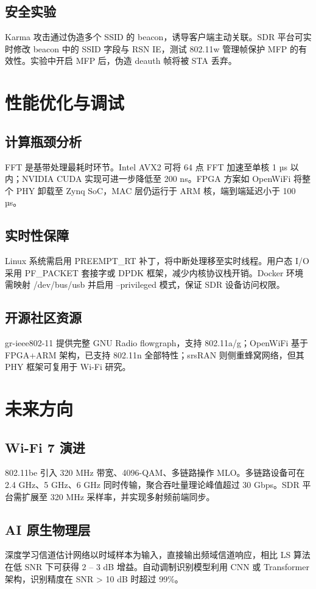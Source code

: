 \section{安全实验}
Karma 攻击通过伪造多个 SSID 的 beacon，诱导客户端主动关联。SDR 平台可实时修改 beacon 中的 SSID 字段与 RSN IE，测试 802.11w 管理帧保护 MFP 的有效性。实验中开启 MFP 后，伪造 deauth 帧将被 STA 丢弃。\par
\chapter{性能优化与调试}
\section{计算瓶颈分析}
FFT 是基带处理最耗时环节。Intel AVX2 可将 64 点 FFT 加速至单核 1 µs 以内；NVIDIA CUDA 实现可进一步降低至 200 ns。FPGA 方案如 OpenWiFi 将整个 PHY 卸载至 Zynq SoC，MAC 层仍运行于 ARM 核，端到端延迟小于 100 µs。\par
\section{实时性保障}
Linux 系统需启用 PREEMPT\_{}RT 补丁，将中断处理移至实时线程。用户态 I/O 采用 PF\_{}PACKET 套接字或 DPDK 框架，减少内核协议栈开销。Docker 环境需映射 /dev/bus/usb 并启用 --privileged 模式，保证 SDR 设备访问权限。\par
\section{开源社区资源}
gr-ieee802-11 提供完整 GNU Radio flowgraph，支持 802.11a/g；OpenWiFi 基于 FPGA+ARM 架构，已支持 802.11n 全部特性；srsRAN 则侧重蜂窝网络，但其 PHY 框架可复用于 Wi-Fi 研究。\par
\chapter{未来方向}
\section{Wi-Fi 7 演进}
802.11be 引入 320 MHz 带宽、4096-QAM、多链路操作 MLO。多链路设备可在 2.4 GHz、5 GHz、6 GHz 同时传输，聚合吞吐量理论峰值超过 30 Gbps。SDR 平台需扩展至 320 MHz 采样率，并实现多射频前端同步。\par
\section{AI 原生物理层}
深度学习信道估计网络以时域样本为输入，直接输出频域信道响应，相比 LS 算法在低 SNR 下可获得 2 – 3 dB 增益。自动调制识别模型利用 CNN 或 Transformer 架构，识别精度在 SNR > 10 dB 时超过 99\%{}。\par

